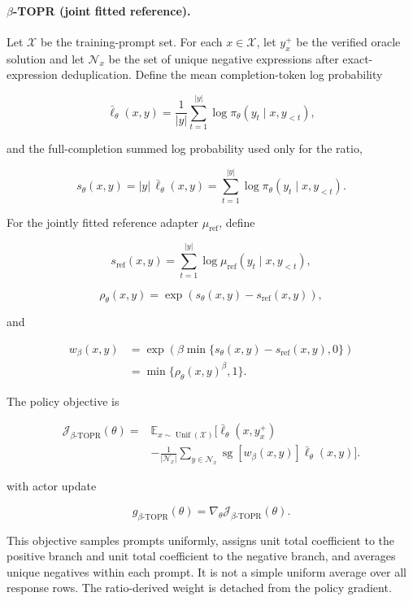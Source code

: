 \documentclass{article}
\theoremstyle{plain}
\theoremstyle{definition}
\theoremstyle{remark}
\begin{document}
\paragraph{\(\beta\)-TOPR (joint fitted reference).}

Let \(\mathcal X\) be the training-prompt set. For each
\(x\in\mathcal X\), let \(y_x^+\) be the verified oracle solution and
let \(\mathcal N_x\) be the set of unique negative expressions after
exact-expression deduplication. Define the mean completion-token log
probability

\[
\bar{\ell}_\theta(x,y)
=
\frac{1}{|y|}
\sum_{t=1}^{|y|}
\log\pi_\theta(y_t\mid x,y_{<t}),
\]

and the full-completion summed log probability used only for the ratio,

\[
s_\theta(x,y)
=
|y|\,\bar{\ell}_\theta(x,y)
=
\sum_{t=1}^{|y|}
\log\pi_\theta(y_t\mid x,y_{<t}).
\]

For the jointly fitted reference adapter \(\mu_{\mathrm{ref}}\), define

\[
s_{\mathrm{ref}}(x,y)
=
\sum_{t=1}^{|y|}
\log\mu_{\mathrm{ref}}(y_t\mid x,y_{<t}),
\]

\[
\rho_\theta(x,y)
=
\exp\!\left(s_\theta(x,y)-s_{\mathrm{ref}}(x,y)\right),
\]

and

\[
\begin{aligned}
w_\beta(x,y)
&=
\exp\!\left(
\beta\min\{s_\theta(x,y)-s_{\mathrm{ref}}(x,y),0\}
\right) \\
&=
\min\{\rho_\theta(x,y)^\beta,1\}.
\end{aligned}
\]

The policy objective is

\[
\begin{aligned}
\mathcal J_{\beta\text{-}\mathrm{TOPR}}(\theta)
={}&
\mathbb E_{x\sim\operatorname{Unif}(\mathcal X)}
\Bigg[
\bar{\ell}_\theta(x,y_x^+) \\
&-
\frac{1}{|\mathcal N_x|}
\sum_{y\in\mathcal N_x}
\operatorname{sg}[w_\beta(x,y)]
\bar{\ell}_\theta(x,y)
\Bigg].
\end{aligned}
\]

with actor update

\[
g_{\beta\text{-}\mathrm{TOPR}}(\theta)
=
\nabla_\theta\mathcal J_{\beta\text{-}\mathrm{TOPR}}(\theta).
\]

This objective samples prompts uniformly, assigns unit total
coefficient to the positive branch and unit total coefficient to the
negative branch, and averages unique negatives within each prompt. It
is not a simple uniform average over all response rows. The
ratio-derived weight is detached from the policy gradient.
\end{document}
